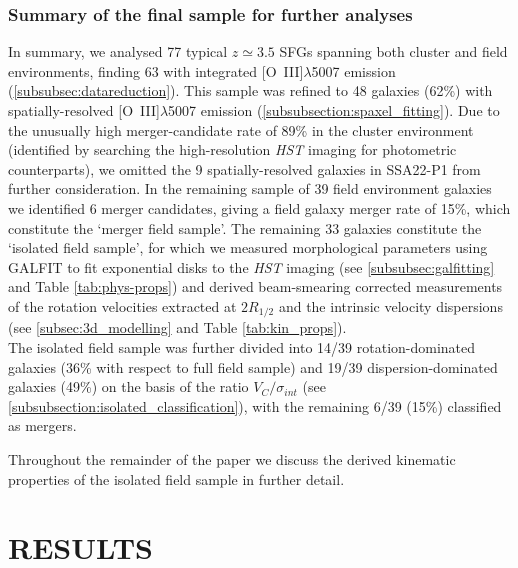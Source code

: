 \documentclass[fleqn,usenatbib]{mnras}
\begin{document}
\subsubsection{Summary of the final sample for further analyses}\label{subsubsec:kin_sample_summary}
In summary, we analysed 77 typical $z\simeq3.5$ SFGs spanning both cluster and field environments, finding 63 with integrated [O~{\sc III}]$\lambda$5007 emission (\cref{subsubsec:datareduction}).
This sample was refined to 48 galaxies (62\%) with spatially-resolved [O~{\sc III}]$\lambda$5007 emission (\cref{subsubsection:spaxel_fitting}).
Due to the unusually high merger-candidate rate of 89\% in the cluster environment (identified by searching the high-resolution {\em HST} imaging for photometric counterparts), we omitted the 9 spatially-resolved galaxies in SSA22-P1 from further consideration.
In the remaining sample of 39 field environment galaxies we identified 6 merger candidates, giving a field galaxy merger rate of 15\%, which constitute the `merger field sample'.
The remaining 33 galaxies constitute the `isolated field sample', for which we measured morphological parameters using {\scriptsize GALFIT} to fit exponential disks to the {\em HST} imaging (see \cref{subsubsec:galfitting} and Table \ref{tab:phys-props}) and derived beam-smearing corrected measurements of the rotation velocities extracted at $2R_{1/2}$ and the intrinsic velocity dispersions (see \cref{subsec:3d_modelling} and Table \ref{tab:kin_props}). \\

The isolated field sample was further divided into 14/39 rotation-dominated galaxies (36\% with respect to full field sample) and 19/39 dispersion-dominated galaxies (49\%) on the basis of the ratio $V_{C}/\sigma_{int}$ (see \cref{subsubsection:isolated_classification}), with the remaining 6/39 (15\%) classified as mergers.

Throughout the remainder of the paper we discuss the derived kinematic properties of the isolated field sample in further detail.

\section{RESULTS}\label{sec:results}
\end{document}
